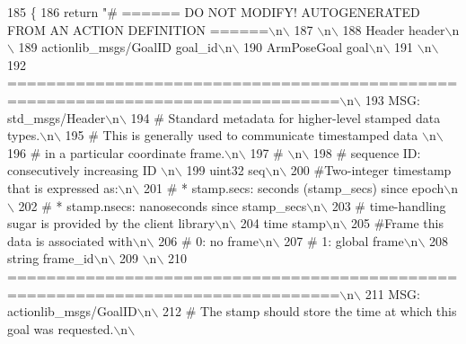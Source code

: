\begin{DoxyCode}
185   \{
186     \textcolor{keywordflow}{return} \textcolor{stringliteral}{"# ====== DO NOT MODIFY! AUTOGENERATED FROM AN ACTION DEFINITION ======\(\backslash\)n\(\backslash\)}
187 \textcolor{stringliteral}{\(\backslash\)n\(\backslash\)}
188 \textcolor{stringliteral}{Header header\(\backslash\)n\(\backslash\)}
189 \textcolor{stringliteral}{actionlib\_msgs/GoalID goal\_id\(\backslash\)n\(\backslash\)}
190 \textcolor{stringliteral}{ArmPoseGoal goal\(\backslash\)n\(\backslash\)}
191 \textcolor{stringliteral}{\(\backslash\)n\(\backslash\)}
192 \textcolor{stringliteral}{================================================================================\(\backslash\)n\(\backslash\)}
193 \textcolor{stringliteral}{MSG: std\_msgs/Header\(\backslash\)n\(\backslash\)}
194 \textcolor{stringliteral}{# Standard metadata for higher-level stamped data types.\(\backslash\)n\(\backslash\)}
195 \textcolor{stringliteral}{# This is generally used to communicate timestamped data \(\backslash\)n\(\backslash\)}
196 \textcolor{stringliteral}{# in a particular coordinate frame.\(\backslash\)n\(\backslash\)}
197 \textcolor{stringliteral}{# \(\backslash\)n\(\backslash\)}
198 \textcolor{stringliteral}{# sequence ID: consecutively increasing ID \(\backslash\)n\(\backslash\)}
199 \textcolor{stringliteral}{uint32 seq\(\backslash\)n\(\backslash\)}
200 \textcolor{stringliteral}{#Two-integer timestamp that is expressed as:\(\backslash\)n\(\backslash\)}
201 \textcolor{stringliteral}{# * stamp.secs: seconds (stamp\_secs) since epoch\(\backslash\)n\(\backslash\)}
202 \textcolor{stringliteral}{# * stamp.nsecs: nanoseconds since stamp\_secs\(\backslash\)n\(\backslash\)}
203 \textcolor{stringliteral}{# time-handling sugar is provided by the client library\(\backslash\)n\(\backslash\)}
204 \textcolor{stringliteral}{time stamp\(\backslash\)n\(\backslash\)}
205 \textcolor{stringliteral}{#Frame this data is associated with\(\backslash\)n\(\backslash\)}
206 \textcolor{stringliteral}{# 0: no frame\(\backslash\)n\(\backslash\)}
207 \textcolor{stringliteral}{# 1: global frame\(\backslash\)n\(\backslash\)}
208 \textcolor{stringliteral}{string frame\_id\(\backslash\)n\(\backslash\)}
209 \textcolor{stringliteral}{\(\backslash\)n\(\backslash\)}
210 \textcolor{stringliteral}{================================================================================\(\backslash\)n\(\backslash\)}
211 \textcolor{stringliteral}{MSG: actionlib\_msgs/GoalID\(\backslash\)n\(\backslash\)}
212 \textcolor{stringliteral}{# The stamp should store the time at which this goal was requested.\(\backslash\)n\(\backslash\)}

\end{DoxyCode}
